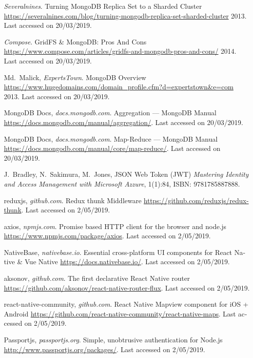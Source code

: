 \begin{thebibliography}{1}
\bibitem{[MONGO3]} {\textlatin{
{{\em Severalnines}}.
Turning MongoDB Replica Set to a Sharded Cluster
\url{https://severalnines.com/blog/turning-mongodb-replica-set-sharded-cluster}
  2013. Last accessed on 20/03/2019}}.

\bibitem{[MONGO4]} {\textlatin{
{{\em Compose}}.
GridFS \& MongoDB: Pros And Cons
\url{https://www.compose.com/articles/gridfs-and-mongodb-pros-and-cons/}
  2014. Last accessed on 20/03/2019}}.

\bibitem{[MONGO5]} {\textlatin{
{Md.~Malick, {\em ExpertsTown}}.
MongoDB Overview
\url{https://www.hugedomains.com/domain_profile.cfm?d=expertstown&e=com}
  2013. Last accessed on 20/03/2019}}.

\bibitem{[MONGO6]} {\textlatin{
{MongoDB Docs, {\em docs.mongodb.com}}.
Aggregation — MongoDB Manual
\url{https://docs.mongodb.com/manual/aggregation/}. Last accessed on 20/03/2019}}.

\bibitem{[MONGO7]} {\textlatin{
{MongoDB Docs, {\em docs.mongodb.com}}.
Map-Reduce — MongoDB Manual
\url{https://docs.mongodb.com/manual/core/map-reduce/}. Last accessed on 20/03/2019}}.

\bibitem{[JWT1]} {\textlatin{
J.~Bradley, N.~Sakimura, M.~Jones,
JSON Web Token (JWT)
{\em  Mastering Identity and Access Management with Microsoft Azzure}, 1(1):84, ISBN: 9781785887888}}.

\bibitem{[THUNK]} {\textlatin{
{reduxjs, {\em github.com}}.
Redux thunk Middleware
\url{https://github.com/reduxjs/redux-thunk}. Last accessed on 2/05/2019}}.

\bibitem{[AXIOS]} {\textlatin{
{axios, {\em npmjs.com}}.
Promise based HTTP client for the browser and node.js
\url{https://www.npmjs.com/package/axios}. Last accessed on 2/05/2019}}.

\bibitem{[NB]} {\textlatin{
{NativeBase, {\em nativebase.io}}.
Essential cross-platform UI components for React Native & Vue Native
\url{https://docs.nativebase.io/}. Last accessed on 2/05/2019}}.

\bibitem{[RNRF]} {\textlatin{
{aksonov, {\em github.com}}.
The first declarative React Native router
\url{https://github.com/aksonov/react-native-router-flux}. Last accessed on 2/05/2019}}.

\bibitem{[RNM]} {\textlatin{
{react-native-community, {\em github.com}}.
React Native Mapview component for iOS + Android
\url{https://github.com/react-native-community/react-native-maps}. Last accessed on 2/05/2019}}.


\bibitem{[PASSPORT]} {\textlatin{
{Passportjs, {\em passportjs.org}}.
Simple, unobtrusive authentication for Node.js
\url{http://www.passportjs.org/packages/}. Last accessed on 2/05/2019}}.



\end{thebibliography}
